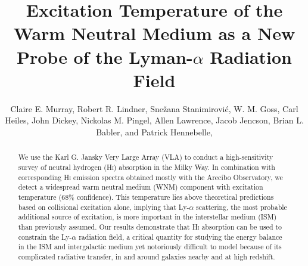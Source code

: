 \documentclass{aastex}
\begin{document}
\title{Excitation Temperature of the 
       Warm Neutral Medium as a New Probe of 
       the Lyman-$\alpha$ Radiation Field}

\author{Claire E. Murray, 
        Robert R. Lindner, 
        Sne\v{z}ana Stanimirovi\'{c},
        W. M. Goss, 
        Carl Heiles, 
        John Dickey, 
        Nickolas M. Pingel, 
        Allen Lawrence,
        Jacob Jencson, 
        Brian L. Babler, and
        Patrick Hennebelle,}




\begin{abstract}
We use the Karl G. Jansky Very Large Array (VLA) to conduct a high-sensitivity 
survey of neutral hydrogen (H\textsc{i}) absorption
in the Milky Way. In combination with corresponding
H\textsc{i} emission spectra obtained mostly with the Arecibo
Observatory,  we detect a widespread warm neutral medium (WNM) component with
excitation temperature \StackedSpinTemp{}
(68\% confidence).
This temperature lies above theoretical predictions 
based on collisional excitation alone, implying that Ly-$\alpha$
scattering, the most probable additional source of excitation, 
is more important in the interstellar medium (ISM) than
previously assumed. Our results demonstrate that
H\textsc{i} absorption can be used to constrain the
Ly-$\alpha$ radiation field, a critical quantity
for studying the energy balance in
the ISM and intergalactic medium yet
notoriously difficult to model because of its
complicated radiative transfer, in and around
galaxies nearby and at high redshift.
\end{abstract}
\end{document}
